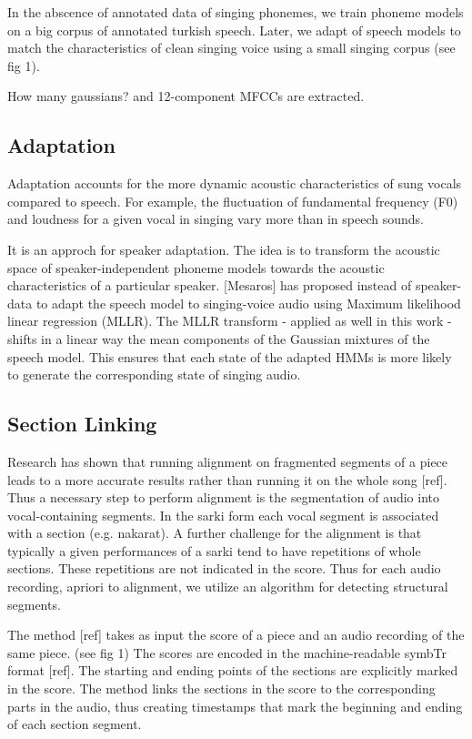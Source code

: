 \documentclass{article}
\begin{document}
In the abscence of annotated data of singing phonemes, we train phoneme models on a big corpus of annotated turkish speech. Later, we adapt of speech models to match the characteristics of clean singing voice using a small singing corpus (see fig 1).

How many gaussians? and 12-component MFCCs are extracted.

\subsection{Adaptation}
Adaptation accounts for the more dynamic acoustic characteristics of sung vocals compared to speech. For example, the fluctuation of fundamental frequency (F0) and loudness for a given vocal in singing vary more than in speech sounds. 

It is an approch for speaker adaptation. The idea is to transform the acoustic space of speaker-independent phoneme models towards the acoustic characteristics of a particular speaker.  [Mesaros] has proposed instead of speaker-data to adapt the speech model to singing-voice audio using Maximum likelihood linear regression (MLLR). The MLLR transform - applied as well in this work - shifts in a linear way the mean components of the Gaussian mixtures of the speech model. This ensures that each state of the adapted HMMs is more likely to generate the corresponding state of singing audio.  

  

\subsection{Section Linking}
Research has shown that running alignment on fragmented segments of a piece leads to a more accurate results rather than running it on the whole song [ref]. Thus a necessary step to perform
alignment is the segmentation of audio into vocal-containing segments. In the sarki form each
vocal segment is associated with a section (e.g. nakarat).
A further challenge for the alignment is that typically a given performances
of a sarki tend to have repetitions of whole sections. These repetitions
are not indicated in the score. Thus for each audio recording, apriori to alignment, we utilize
an algorithm for detecting structural segments.

The method {[}ref{]} takes as input the score of a piece and an audio
recording of the same piece. (see fig 1) The scores are encoded in the machine-readable
symbTr format {[}ref{]}. The starting and ending points of the sections
are explicitly marked in the score. The method links the sections
in the score to the corresponding parts in the audio, thus creating
timestamps that mark the beginning and ending of each section segment.
\end{document}
